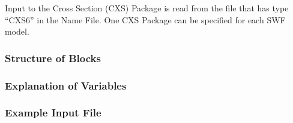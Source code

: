 Input to the Cross Section (CXS) Package is read from the file that has type ``CXS6'' in the Name File.  One CXS Package can be specified for each SWF model. 

\vspace{5mm}
\subsubsection{Structure of Blocks}





\vspace{5mm}
\subsubsection{Explanation of Variables}
\begin{description}

\end{description}

\vspace{5mm}
\subsubsection{Example Input File}


